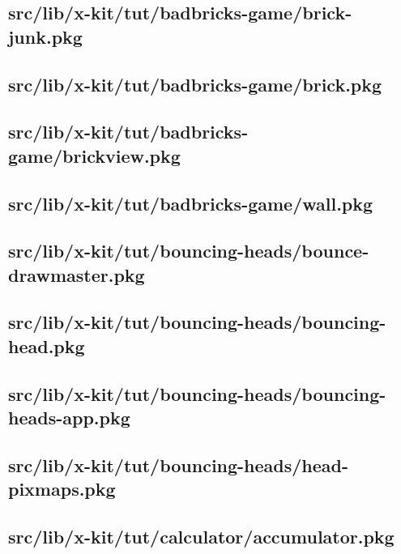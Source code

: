 \subsection{src/lib/x-kit/tut/badbricks-game/brick-junk.pkg}


\subsection{src/lib/x-kit/tut/badbricks-game/brick.pkg}


\subsection{src/lib/x-kit/tut/badbricks-game/brickview.pkg}


\subsection{src/lib/x-kit/tut/badbricks-game/wall.pkg}


\subsection{src/lib/x-kit/tut/bouncing-heads/bounce-drawmaster.pkg}


\subsection{src/lib/x-kit/tut/bouncing-heads/bouncing-head.pkg}


\subsection{src/lib/x-kit/tut/bouncing-heads/bouncing-heads-app.pkg}


\subsection{src/lib/x-kit/tut/bouncing-heads/head-pixmaps.pkg}


\subsection{src/lib/x-kit/tut/calculator/accumulator.pkg}


